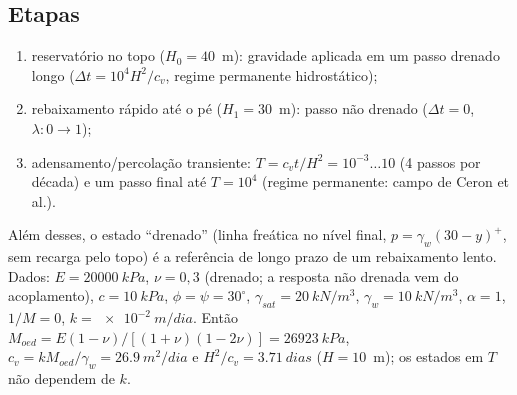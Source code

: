 \documentclass[11pt,a4paper]{article}
\begin{document}
\subsection{Etapas}
\begin{enumerate}
\item reservatório no topo ($H_0=40$~m): gravidade aplicada em um passo drenado longo
  ($\Delta t=10^4H^2/c_v$, regime permanente hidrostático);
\item rebaixamento rápido até o pé ($H_1=30$~m): passo não drenado ($\Delta t=0$, $\lambda:0\to1$);
\item adensamento/percolação transiente: $T=c_vt/H^2=10^{-3}\dots10$ (4 passos por década) e um passo
  final até $T=10^4$ (regime permanente: campo de Ceron et al.).
\end{enumerate}
Além desses, o estado ``drenado'' (linha freática no nível final, $p=\gamma_w(30-y)^+$, sem recarga
pelo topo) é a referência de longo prazo de um rebaixamento lento.
Dados: $E=\SI{20000}{kPa}$, $\nu=0{,}3$ (drenado; a resposta não drenada vem do acoplamento),
$c=\SI{10}{kPa}$, $\phi=\psi=30^\circ$, $\gamma_{sat}=\SI{20}{kN/m^3}$, $\gamma_w=\SI{10}{kN/m^3}$,
$\alpha=1$, $1/M=0$, $k=\SI{e-2}{m/dia}$. Então $M_{oed}=E(1-\nu)/[(1+\nu)(1-2\nu)]=\SI{26923}{kPa}$,
$c_v=kM_{oed}/\gamma_w=\SI{26.9}{m^2/dia}$ e $H^2/c_v=\SI{3.71}{dias}$ ($H=10$~m); os estados em $T$
não dependem de $k$.
\end{document}
